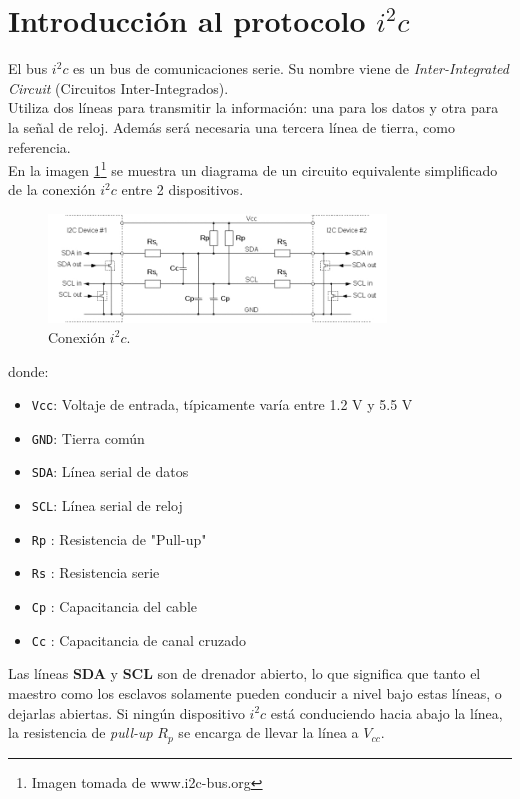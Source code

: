 \documentclass[main]{subfiles}
\begin{document}
\newpage
\section{Introducci\'on al protocolo $i^2c$}

El bus $i^2c$ es un bus de comunicaciones serie. Su nombre viene de \emph{Inter-Integrated Circuit} (Circuitos Inter-Integrados).\\
Utiliza dos l\'ineas para transmitir la informaci\'on: una para los datos y otra para la señal de reloj. Adem\'as ser\'a necesaria una tercera l\'inea de tierra, como referencia.\\
En la imagen \ref{fig:setup}\footnote{Imagen tomada de www.i2c-bus.org} se muestra un diagrama de un circuito equivalente simplificado de la conexi\'on $i^2c$ entre 2 dispositivos.

\begin{figure}[h!]
	\centering
	\includegraphics[width=0.8\textwidth]{./pics_sniffer/setup.jpg}
	\caption{Conexi\'on $i^2c$.}
	\label{fig:setup}
\end{figure}
donde:
\begin{itemize}
\item \verb+Vcc+:	 Voltaje de entrada, t\'ipicamente var\'ia entre 1.2 V y 5.5 V
\item \verb+GND+:	 Tierra com\'un
\item \verb+SDA+:	 L\'inea serial de datos
\item \verb+SCL+:	 L\'inea serial de reloj
\item \verb+Rp+ :	 Resistencia de "Pull-up"
\item \verb+Rs+ :	 Resistencia serie
\item \verb+Cp+ :	 Capacitancia del cable
\item \verb+Cc+ :	 Capacitancia de canal cruzado
\end{itemize}

Las l\'ineas \textbf{SDA} y \textbf{SCL} son de drenador abierto, lo que significa que tanto el maestro como los esclavos solamente pueden conducir a nivel bajo estas l\'ineas, o dejarlas abiertas. Si ning\'un dispositivo $i^2c$ est\'a conduciendo hacia abajo la l\'inea, la resistencia de \emph{pull-up} $R_p$ se encarga de llevar la l\'inea a $V_{cc}$.\\
\end{document}
